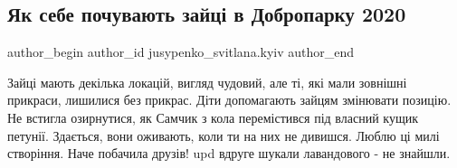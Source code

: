  
 
 
 
 
 
\subsection{Як себе почувають зайці в Добропарку 2020}
\label{sec:20_07_2020.fb.jusypenko_svitlana.kyiv.1.zajci_v_dobroparku_2020}
 
\ifcmt
 author_begin
   author_id jusypenko_svitlana.kyiv
 author_end
\fi


Зайці мають декілька локацій, вигляд чудовий, але ті, які мали зовнішні
прикраси, лишилися без прикрас. Діти допомагають зайцям змінювати позицію. Не
встигла озирнутися, як Самчик з кола перемістився під власний кущик петунії.
Здається, вони оживають, коли ти на них не дивишся. Люблю ці милі створіння.
Наче побачила друзів! upd вдруге шукали лавандового - не знайшли.
